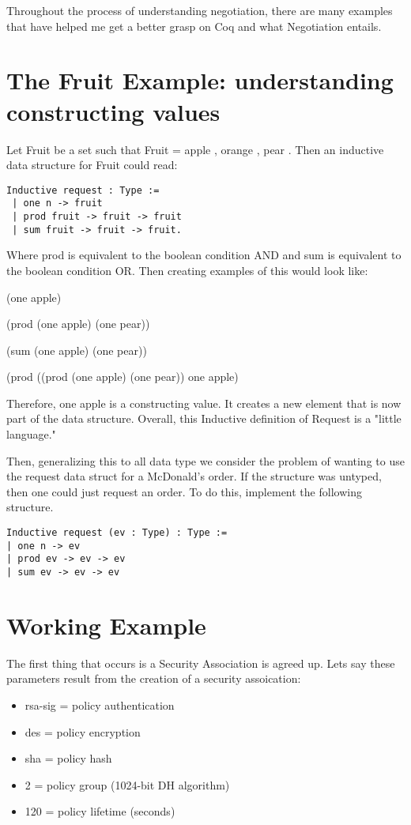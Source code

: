 \documentclass[10pt]{report}
\begin{document}
Throughout the process of understanding negotiation, there are many
examples that have helped me get a better grasp on Coq and what Negotiation
entails. 

\section{The Fruit Example: understanding constructing values}

Let Fruit be a set such that Fruit = { apple , orange , pear }. Then an
inductive data structure for Fruit could read:  

\begin{verbatim}
Inductive request : Type := 
 | one n -> fruit
 | prod fruit -> fruit -> fruit
 | sum fruit -> fruit -> fruit.
\end{verbatim}

Where prod is equivalent to the boolean condition AND and sum is equivalent
to the boolean condition OR. Then creating examples of this would look like: 


(one apple)

(prod (one apple) (one pear))

(sum (one apple) (one pear))

(prod ((prod (one apple) (one pear)) one apple)


Therefore, one apple is a constructing value. It creates a new element that is
now part of the data structure. Overall, this Inductive definition of Request
is a "little language."

Then, generalizing this to all data type we consider the problem of wanting
to use the request data struct for a McDonald's order. If the structure was
untyped, then one could just request an order. To do this, implement the
following structure. 

\begin{verbatim}
Inductive request (ev : Type) : Type :=
| one n -> ev
| prod ev -> ev -> ev
| sum ev -> ev -> ev
\end{verbatim}

\section{Working Example}

The first thing that occurs is a Security Association is agreed up.
Lets say these parameters result from the creation of a security
assoication:

\begin{itemize}
\item rsa-sig = policy authentication
\item des = policy encryption
\item sha = policy hash
\item 2 = policy group (1024-bit DH algorithm)
\item 120 = policy lifetime (seconds)
\end{itemize}
\end{document}
